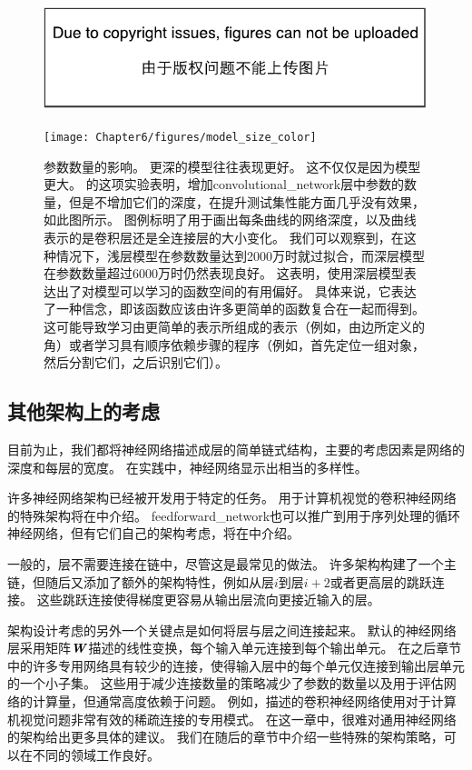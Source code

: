 \begin{figure}[!htb]
\ifOpenSource
\centerline{\includegraphics{figure.pdf}}
\else
\centerline{\texttt{[image: Chapter6/figures/model\_size\_color]}}
\fi
\caption{参数数量的影响。
更深的模型往往表现更好。
这不仅仅是因为模型更大。
\cite{Goodfellow+et+al-ICLR2014a}的这项实验表明，增加\gls{convolutional_network}层中参数的数量，但是不增加它们的深度，在提升测试集性能方面几乎没有效果，如此图所示。
图例标明了用于画出每条曲线的网络深度，以及曲线表示的是卷积层还是全连接层的大小变化。
我们可以观察到，在这种情况下，浅层模型在参数数量达到2000万时就过拟合，而深层模型在参数数量超过6000万时仍然表现良好。
这表明，使用深层模型表达出了对模型可以学习的函数空间的有用偏好。
具体来说，它表达了一种信念，即该函数应该由许多更简单的函数复合在一起而得到。
这可能导致学习由更简单的表示所组成的表示（例如，由边所定义的角）或者学习具有顺序依赖步骤的程序（例如，首先定位一组对象，然后分割它们，之后识别它们）。}
\label{fig:chap6_model_size_color}
\end{figure}

\subsection{其他架构上的考虑}
\label{sec:other_architectural_considerations}

目前为止，我们都将神经网络描述成层的简单链式结构，主要的考虑因素是网络的深度和每层的宽度。
在实践中，神经网络显示出相当的多样性。

许多神经网络架构已经被开发用于特定的任务。
用于计算机视觉的卷积神经网络的特殊架构将在中介绍。
\gls{feedforward_network}也可以推广到用于序列处理的循环神经网络，但有它们自己的架构考虑，将在中介绍。


一般的，层不需要连接在链中，尽管这是最常见的做法。
许多架构构建了一个主链，但随后又添加了额外的架构特性，例如从层$i$到层$i+2$或者更高层的跳跃连接。
这些跳跃连接使得梯度更容易从输出层流向更接近输入的层。

架构设计考虑的另外一个关键点是如何将层与层之间连接起来。
默认的神经网络层采用矩阵$\boldsymbol{\mathit{W}}$描述的线性变换，每个输入单元连接到每个输出单元。
在之后章节中的许多专用网络具有较少的连接，使得输入层中的每个单元仅连接到输出层单元的一个小子集。
这些用于减少连接数量的策略减少了参数的数量以及用于评估网络的计算量，但通常高度依赖于问题。
例如，描述的卷积神经网络使用对于计算机视觉问题非常有效的稀疏连接的专用模式。
在这一章中，很难对通用神经网络的架构给出更多具体的建议。
我们在随后的章节中介绍一些特殊的架构策略，可以在不同的领域工作良好。

